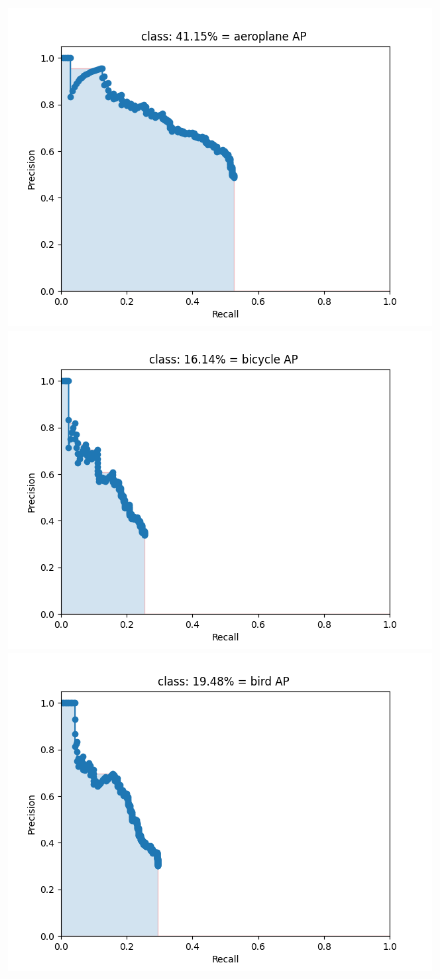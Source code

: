 \documentclass{article}%
\begin{document}
\begin{figure}[H]
    \centering
	\begin{minipage}{0.24\linewidth}
		\centering
		\includegraphics[width=0.9\linewidth]{fast_rcnn/mAP_output/classes/aeroplane.png}
	\end{minipage}
	\begin{minipage}{0.24\linewidth}
		\centering
		\includegraphics[width=0.9\linewidth]{fast_rcnn/mAP_output/classes/bicycle.png}
	\end{minipage}
    \begin{minipage}{0.24\linewidth}
		\centering
		\includegraphics[width=0.9\linewidth]{fast_rcnn/mAP_output/classes/bird.png}

\end{minipage}
\end{figure}
\end{document}
